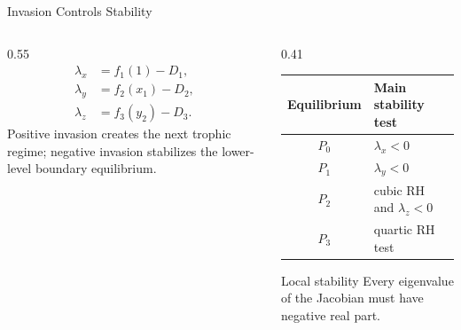 \begin{frame}{Invasion Controls Stability}
  \begin{columns}[T,onlytextwidth]
    \begin{column}{0.55\textwidth}
      \begin{align*}
        \lambda_x &= f_1(1)-D_1,\\
        \lambda_y &= f_2(x_1)-D_2,\\
        \lambda_z &= f_3(y_2)-D_3.
      \end{align*}
      Positive invasion creates the next trophic regime; negative invasion
      stabilizes the lower-level boundary equilibrium.
    \end{column}
    \begin{column}{0.41\textwidth}
      {\fontsize{11}{14}\selectfont
      \renewcommand{\arraystretch}{1.25}
      \begin{tabular}{cl}
        \toprule
        Equilibrium & Main stability test \\
        \midrule
        $P_0$ & $\lambda_x<0$ \\
        $P_1$ & $\lambda_y<0$ \\
        $P_2$ & cubic RH and $\lambda_z<0$ \\
        $P_3$ & quartic RH test \\
        \bottomrule
      \end{tabular}
      \vspace{0.35cm}
      \begin{block}{Local stability}
        Every eigenvalue of the Jacobian must have negative real part.
      \end{block}}
    \end{column}
  \end{columns}
\end{frame}

